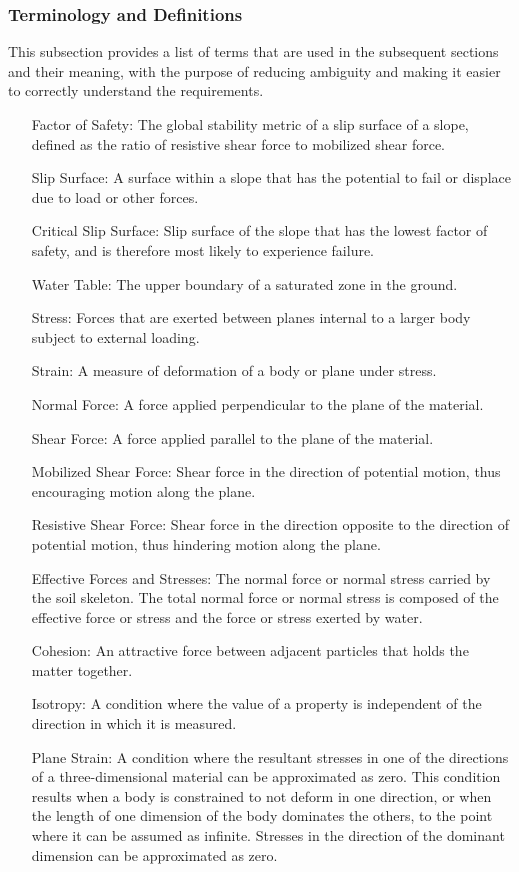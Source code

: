 \documentclass[12pt]{article}
\begin{document}
\subsubsection{Terminology and Definitions}
\label{Sec:TermDefs}
This subsection provides a list of terms that are used in the subsequent sections and their meaning, with the purpose of reducing ambiguity and making it easier to correctly understand the requirements.
\begin{itemize}
\item[Factor of Safety:]The global stability metric of a slip surface of a slope, defined as the ratio of resistive shear force to mobilized shear force.
\item[Slip Surface:]A surface within a slope that has the potential to fail or displace due to load or other forces.
\item[Critical Slip Surface:]Slip surface of the slope that has the lowest factor of safety, and is therefore most likely to experience failure.
\item[Water Table:]The upper boundary of a saturated zone in the ground.
\item[Stress:]Forces that are exerted between planes internal to a larger body subject to external loading.
\item[Strain:]A measure of deformation of a body or plane under stress.
\item[Normal Force:]A force applied perpendicular to the plane of the material.
\item[Shear Force:]A force applied parallel to the plane of the material.
\item[Mobilized Shear Force:]Shear force in the direction of potential motion, thus encouraging motion along the plane.
\item[Resistive Shear Force:]Shear force in the direction opposite to the direction of potential motion, thus hindering motion along the plane.
\item[Effective Forces and Stresses:]The normal force or normal stress carried by the soil skeleton. The total normal force or normal stress is composed of the effective force or stress and the force or stress exerted by water.
\item[Cohesion:]An attractive force between adjacent particles that holds the matter together.
\item[Isotropy:]A condition where the value of a property is independent of the direction in which it is measured.
\item[Plane Strain:]A condition where the resultant stresses in one of the directions of a  three-dimensional material can be approximated as zero. This condition results when a body is constrained to not deform in one direction, or when the length of one dimension of the body dominates the others, to the point where it can be assumed as infinite. Stresses in the direction of the dominant dimension can be approximated as zero.
\end{itemize}
\end{document}

